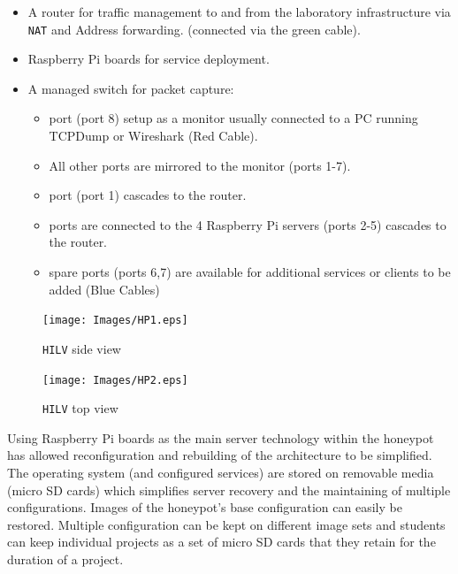\begin{itemize}
\item \noindent A router for traffic management to and from the laboratory infrastructure via \texttt{NAT} and Address forwarding. (connected via the green cable).
\item {} Raspberry Pi boards for service deployment.
\item \noindent A managed switch for packet capture:
\begin{itemize}
	\item {} port (port 8) setup as a monitor usually connected to a PC running TCPDump or Wireshark (Red Cable).
	\item \noindent All other ports are mirrored to the monitor (ports 1-7). 
	\item {} port (port 1) cascades to the router. 
	\item {} ports are connected to the 4 Raspberry Pi servers (ports 2-5) cascades to the router. 
	\item {} spare ports (ports 6,7) are available for additional services or clients to be added (Blue Cables)
\end{itemize}
\end{itemize}

\begin{figure}[ht]
  \centering
  \begin{minipage}[h]{0.45\textwidth}
    \texttt{[image: Images/HP1.eps]}
    \caption{\texttt{HILV} side view}
    \label{fig:HP1}
  \end{minipage}
  \hfill
  \begin{minipage}[h]{0.45\textwidth}
    \texttt{[image: Images/HP2.eps]}
    \caption{\texttt{HILV} top view}
    \label{fig:HP2}
  \end{minipage}
\end{figure}


Using Raspberry Pi boards as the main server technology within the honeypot has allowed reconfiguration and rebuilding of the architecture to be simplified. The operating system (and configured services) are stored on removable media (micro SD cards) which simplifies server recovery and the maintaining of multiple configurations. Images of the honeypot's base configuration can easily be restored. Multiple configuration can be kept on different image sets and students can keep individual projects as a set of micro SD cards that they retain for the duration of a project.

